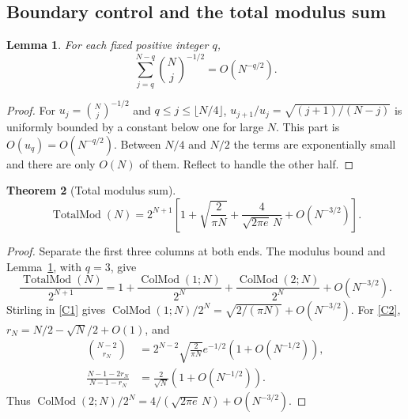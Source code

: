 \documentclass[11pt,reqno]{amsart}
\newtheorem{theorem}{Theorem}[section]
\newtheorem{lemma}[theorem]{Lemma}
\theoremstyle{remark}\newtheorem{remark}[theorem]{Remark}
\DeclareMathOperator{\ColMod}{ColMod}
\DeclareMathOperator{\TotalMod}{TotalMod}
\begin{document}
\subsection{Boundary control and the total modulus sum}
\begin{lemma}\label{tails}
For each fixed positive integer $q$,
\[
\sum_{j=q}^{N-q}\binom Nj^{-1/2}=O(N^{-q/2}).
\]
\end{lemma}
\begin{proof}
For $u_j=\binom Nj^{-1/2}$ and $q\le j\le\lfloor N/4\rfloor$,
$u_{j+1}/u_j=\sqrt{(j+1)/(N-j)}$ is uniformly bounded by a constant below one for large $N$. This part is $O(u_q)=O(N^{-q/2})$. Between $N/4$ and $N/2$ the terms are exponentially small and there are only $O(N)$ of them. Reflect to handle the other half.
\end{proof}
\begin{theorem}[Total modulus sum]\label{totaltheorem}
\begin{equation}\label{TotalModAsym}
\boxed{\TotalMod(N)=2^{N+1}\left[1+\sqrt{\frac2{\pi N}}+
\frac4{\sqrt{2\pi e}\,N}+O(N^{-3/2})\right].}
\end{equation}
\end{theorem}
\begin{proof}
Separate the first three columns at both ends. The modulus bound and Lemma~\ref{tails}, with $q=3$, give
\[
\frac{\TotalMod(N)}{2^{N+1}}=1+
\frac{\ColMod(1;N)}{2^N}+\frac{\ColMod(2;N)}{2^N}+O(N^{-3/2}).
\]
Stirling in \eqref{C1} gives $\ColMod(1;N)/2^N=\sqrt{2/(\pi N)}+O(N^{-3/2})$.
For \eqref{C2}, $r_N=N/2-\sqrt N/2+O(1)$, and
\begin{align*}
\binom{N-2}{r_N}&=2^{N-2}\sqrt{\frac2{\pi N}}e^{-1/2}(1+O(N^{-1/2})),\\
\frac{N-1-2r_N}{N-1-r_N}&=\frac2{\sqrt N}(1+O(N^{-1/2})).
\end{align*}
Thus $\ColMod(2;N)/2^N=4/(\sqrt{2\pi e}\,N)+O(N^{-3/2})$.
\end{proof}
\end{document}
